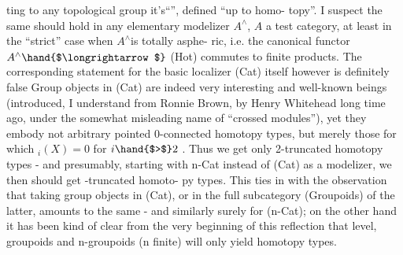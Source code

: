 
ting to any topological group it's``\hand{\uline{\textcolor{black}{classifying space}}}'',  defined ``up to homo-%
topy''.  I suspect the same should hold in any elementary modelizer $A^{\wedge}$,
$A$ a test category,  at least in the ``strict'' case when $A^{\wedge}$\hand{/}is totally asphe-%
ric,  i.e.  the canonical functor  $A^{\wedge}\hand{$\longrightarrow$}$ (Hot)  commutes to finite products.
The corresponding statement for the basic localizer (Cat) itself however is
definitely false  Group objects in (Cat) are indeed very interesting and
well-known beings  (introduced,  I understand from Ronnie Brown, by Henry
Whitehead long time ago,  under the somewhat misleading name of ``crossed
modules''),  yet they embody not arbitrary pointed 0-connected homotopy
types,  but merely those for which \hand{$\pi$}$_i(X) = 0$ for $i \hand{$>$} 2$ .  Thus we get only
2-truncated homotopy types  -  and presumably,   starting with n-Cat
instead of (Cat) as a modelizer,  we then should get -truncated homoto-%
py types.  This ties in with the observation that taking group objects in
(Cat),  or in the full subcategory  (Groupoids)  of the latter,  amounts to
the same  -  and similarly surely for (n-Cat);  on the other hand it has
been kind of clear from the very beginning of this reflection that 
\hand{\uline{\textcolor{black}{finite}}} level,  groupoids and n-groupoids (n finite) will only yield \hand{\uline{\textcolor{black}{trunca-}}}%
\hand{\uline{\textcolor{black}{ted}}} homotopy types.

